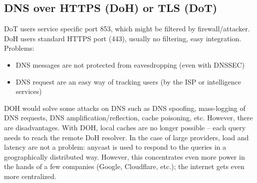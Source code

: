 \subsection{DNS over HTTPS (DoH) or TLS (DoT)}
DoT users service specific port 853, which might be filtered by firewall/attacker. DoH users standard HTTPS port (443), usually no filtering, easy integration.
Problems:
\begin{itemize}
    \item DNS messages are not protected from eavesdropping (even with DNSSEC)
    \item DNS request are an easy way of tracking users (by the ISP or intelligence services)
\end{itemize}

DOH would solve some attacks on DNS such as DNS spoofing, mass-logging of DNS requests, DNS amplification/reflection, cache poisoning, etc. However, there are disadvantages. With DOH, local caches are no longer possible – each query needs to reach the remote DoH resolver. In the case of large providers, load and latency are not a problem: anycast is used to respond to the queries in a geographically distributed way. However, this concentrates even more power in the hands of a few companies (Google, Cloudflare, etc.); the internet gets even more centralized.



